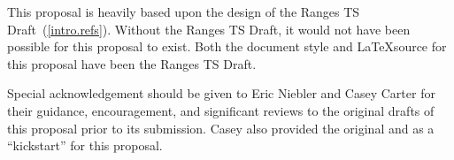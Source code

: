 \setcounter{chapter}{0}

This proposal is heavily based upon the design of the Ranges TS
Draft~(\ref{intro.refs}). Without the Ranges TS Draft, it would
not have been possible for this proposal to exist. Both the
document style and \LaTeX source for this proposal have been
 the Ranges TS
Draft.

Special acknowledgement should be given to Eric Niebler and Casey
Carter for their guidance, encouragement, and significant reviews
to the original drafts of this proposal prior to its submission.
Casey also provided the original  and
 as a ``kickstart'' for this proposal.